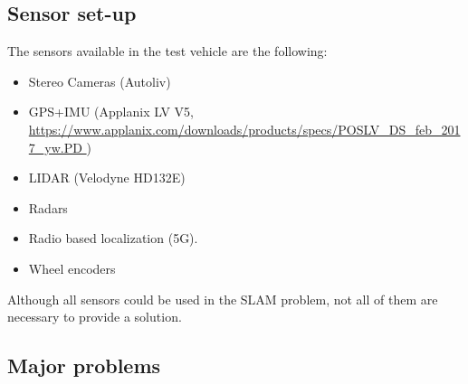 \subsection{Sensor set-up}\label{sec:sensor-setup}
The sensors available in the test vehicle are the following:
\begin{itemize}
\item Stereo Cameras (Autoliv)
\item GPS+IMU (Applanix LV V5,
  \url{https://www.applanix.com/downloads/products/specs/POSLV_DS_feb_2017_yw.PD
  })
\item  \gls{LIDAR} (Velodyne HD132E)
\item  Radars
\item  Radio based localization (5G).
\item  Wheel encoders
\end{itemize}
Although all sensors could be used in the \gls{SLAM} problem, not all of them 
are necessary to provide a solution. 

\subsection{Major problems}

